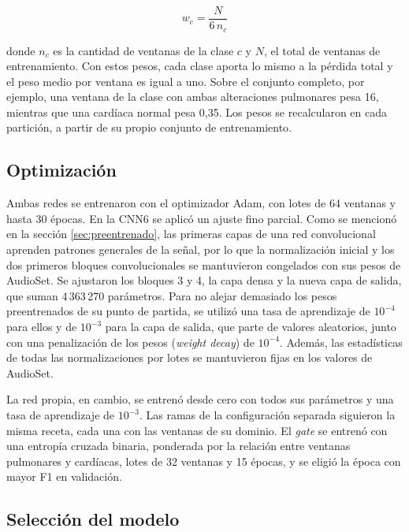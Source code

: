 \begin{equation}
	\label{eq:pesosClase}
	w_c = \frac{N}{6\,n_c}
\end{equation}

\noindent donde $n_c$ es la cantidad de ventanas de la clase $c$ y $N$, el total de ventanas de
entrenamiento. Con estos pesos, cada clase aporta lo mismo a la pérdida total y el peso medio por
ventana es igual a uno. Sobre el conjunto completo, por ejemplo, una ventana de la clase con ambas
alteraciones pulmonares pesa 16, mientras que una cardíaca normal pesa 0,35. Los pesos se
recalcularon en cada partición, a partir de su propio conjunto de entrenamiento.

\subsection{Optimización}
\label{subsec:optimizacion}

Ambas redes se entrenaron con el optimizador Adam, con lotes de 64 ventanas y hasta 30 épocas. En
la CNN6 se aplicó un ajuste fino parcial. Como se mencionó en la sección \ref{sec:preentrenado},
las primeras capas de una red convolucional aprenden patrones generales de la señal, por lo que la
normalización inicial y los dos primeros bloques convolucionales se mantuvieron congelados con sus
pesos de AudioSet. Se ajustaron los bloques 3 y 4, la capa densa y la nueva capa de salida, que
suman 4\,363\,270 parámetros. Para no alejar demasiado los pesos preentrenados de su punto de
partida, se utilizó una tasa de aprendizaje de $10^{-4}$ para ellos y de $10^{-3}$ para la capa de
salida, que parte de valores aleatorios, junto con una penalización de los pesos
(\textit{weight decay}) de $10^{-4}$. Además, las estadísticas de todas las normalizaciones por
lotes se mantuvieron fijas en los valores de AudioSet.

La red propia, en cambio, se entrenó desde cero con todos sus parámetros y una tasa de aprendizaje
de $10^{-3}$. Las ramas de la configuración separada siguieron la misma receta, cada una con las
ventanas de su dominio. El \textit{gate} se entrenó con una entropía cruzada binaria, ponderada por
la relación entre ventanas pulmonares y cardíacas, lotes de 32 ventanas y 15 épocas, y se eligió la
época con mayor F1 en validación.

\subsection{Selección del modelo}
\label{subsec:seleccionModelo}


